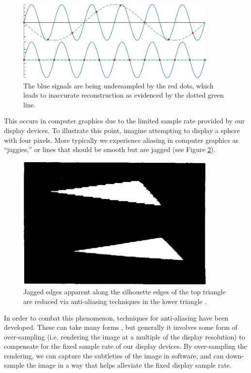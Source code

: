 \begin{figure}[h!]
   \centering
   \includegraphics[width=100mm]{../img/RTR3_05_21_undersampling.png}
   \captionfonts
   \caption[Signal Undersampling]{The blue signals are being undersampled by the red dots, which leads to inaccurate reconstruction as evidenced by the dotted green line. \cite{bib:rtr}}
   \label{fig:undersampling}
\end{figure}

This occurs in computer graphics due to the limited sample rate provided by our display devices. To illustrate this point, imagine attempting to display a sphere with four pixels. More typically we experience aliasing in computer graphics as “jaggies,” or lines that should be smooth but are jagged (see Figure \ref{fig:jaggies}).

\begin{figure}[h!]
   \centering
   \includegraphics[width=100mm]{../img/jaggies.png}
   \captionfonts
   \caption[Jaggies]{Jagged edges apparent along the silhouette edges of the top triangle are reduced via anti-aliasing techniques in the lower triangle \cite{bib:crow1977}.}
   \label{fig:jaggies}
\end{figure}

In order to combat this phenomenon, techniques for anti-aliasing have been developed. These can take many forms \cite{bib:jimenez2011}, but generally it involves some form of over-sampling (i.e. rendering the image at a multiple of the display resolution) to compensate for the fixed sample rate of our display devices. By over-sampling the rendering, we can capture the subtleties of the image in software, and can down-sample the image in a way that helps alleviate the fixed display sample rate.

